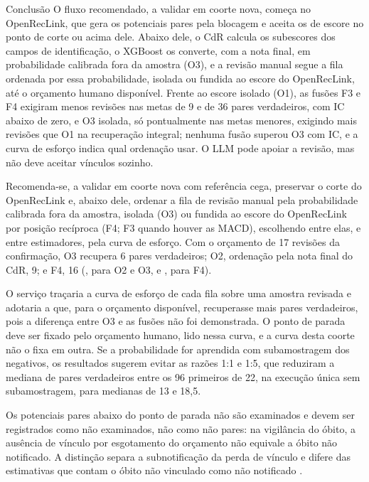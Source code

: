 \begin{chapter}{Conclusão}
O fluxo recomendado, a validar em coorte nova, começa no OpenRecLink, que gera os potenciais pares pela blocagem e aceita os de escore no ponto de corte ou acima dele. Abaixo dele, o CdR calcula os subescores dos campos de identificação, o XGBoost os converte, com a nota final, em probabilidade calibrada fora da amostra (O3), e a revisão manual segue a fila ordenada por essa probabilidade, isolada ou fundida ao escore do OpenRecLink, até o orçamento humano disponível. Frente ao escore isolado (O1), as fusões F3 e F4 exigiram menos revisões nas metas de 9 e de 36 pares verdadeiros, com IC abaixo de zero, e O3 isolada, só pontualmente nas metas menores, exigindo mais revisões que O1 na recuperação integral; nenhuma fusão superou O3 com IC, e a curva de esforço indica qual ordenação usar. O LLM pode apoiar a revisão, mas não deve aceitar vínculos sozinho.



Recomenda-se, a validar em coorte nova com referência cega, preservar o corte do OpenRecLink e, abaixo dele, ordenar a fila de revisão manual pela probabilidade calibrada fora da amostra, isolada (O3) ou fundida ao escore do OpenRecLink por posição recíproca (F4; F3 quando houver as MACD), escolhendo entre elas, e entre estimadores, pela curva de esforço. Com o orçamento de 17 revisões da confirmação, O3 recupera 6 pares verdadeiros; O2, ordenação pela nota final do CdR, 9; e F4, 16 (, para O2 e O3, e , para F4).

O serviço traçaria a curva de esforço de cada fila sobre uma amostra revisada e adotaria a que, para o orçamento disponível, recuperasse mais pares verdadeiros, pois a diferença entre O3 e as fusões não foi demonstrada. O ponto de parada deve ser fixado pelo orçamento humano, lido nessa curva, e a curva desta coorte não o fixa em outra. Se a probabilidade for aprendida com subamostragem dos negativos, os resultados sugerem evitar as razões 1:1 e 1:5, que reduziram a mediana de pares verdadeiros entre os 96 primeiros de 22, na execução única sem subamostragem, para medianas de 13 e 18,5.

Os potenciais pares abaixo do ponto de parada não são examinados e devem ser registrados como não examinados, não como não pares: na vigilância do óbito, a ausência de vínculo por esgotamento do orçamento não equivale a óbito não notificado. A distinção separa a subnotificação da perda de vínculo \cite{Doidge2019linkageerror} e difere das estimativas que contam o óbito não vinculado como não notificado \cite{Oliveira2012uso,Pinheiro2012subnotificacao}.


\end{chapter}
